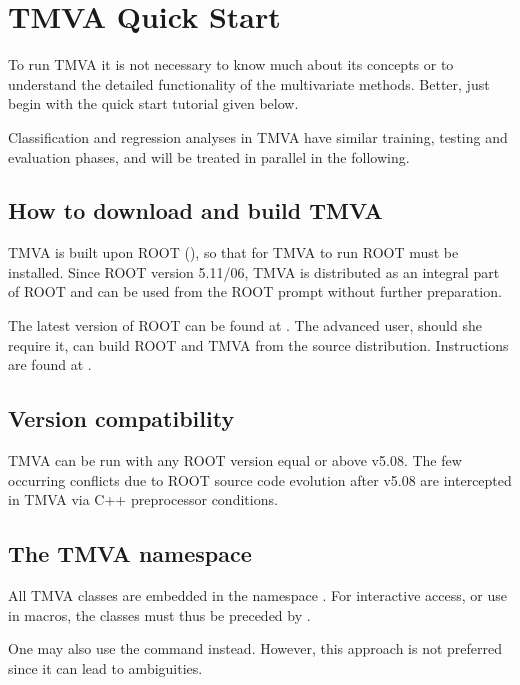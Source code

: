 \section{TMVA Quick Start}
\label{sec:quickstart}

To run TMVA it is not necessary to know much about its concepts or to understand
the detailed functionality of the multivariate methods. Better, just begin
with the quick start tutorial given below.

Classification and regression analyses in TMVA have similar training, testing and
evaluation phases, and will be treated in parallel in the following.

\subsection{How to download and build TMVA}
\label{sec:download}

TMVA is built upon ROOT (), so that for TMVA to run ROOT must be installed. Since ROOT version 5.11/06, TMVA is distributed as an integral part of ROOT and can be used from the ROOT prompt without further preparation.

The latest version of ROOT can be found at . The advanced user, should she require it, can build ROOT and TMVA from the source distribution. Instructions are found at .

\subsection{Version compatibility}
\label{sec:intro:compat}

TMVA can be run with any ROOT version equal or above v5.08.
The few occurring conflicts due to ROOT source code evolution after v5.08 are
intercepted in TMVA via C++ preprocessor conditions.

\subsection{The TMVA namespace}
\label{sec:quickstart:namespace}

All TMVA classes are embedded in the namespace . For interactive access, or
use in macros, the classes must thus be preceded by .

One may also use the command    instead. However, this approach is not preferred since it can lead to ambiguities.

